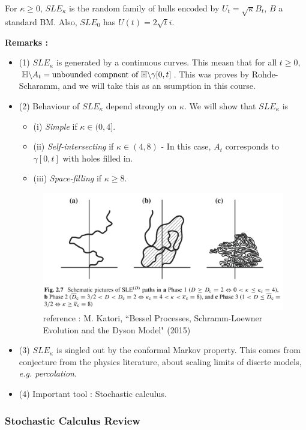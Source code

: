 \documentclass[12pt,a4paper]{article}
\renewenvironment{i}
{\begin{itemize} 
	}%
	{\end{itemize}
}
\begin{document}
For $\kappa\geq 0$, $SLE_{\kappa}$ is the random family of hulls encoded by $U_t = \sqrt{\kappa} B_t$, $B$ a standard BM. Also, $SLE_{0}$ has $U(t) = 2\sqrt{t} i$.
\s

\textbf{Remarks :}
\begin{i}
\item[(1)] $SLE_{\kappa}$ is generated by a continuous curves. This measn that for all $t\geq 0$, $\mathbb{H} \backslash A_t=\text{unbounded compnent of } \mathbb{H}\backslash \gamma[0,t]$. This was proves by Rohde-Scharamm, and we will take this as an ssumption in this course.
\item[(2)] Behaviour of $SLE_{\kappa}$ depend strongly on $\kappa$. We will show that $SLE_{\kappa}$ is
\begin{i}
\item[(i)] \emph{Simple} if $\kappa \in (0,4]$.
\item[(ii)] \emph{Self-intersecting} if $\kappa \in (4,8)$ - In this case, $A_t$ corresponds to $\gamma[0,t]$ with holes filled in.
\item[(iii)] \emph{Space-filling} if $\kappa \geq 8$.
\end{i}
\begin{figure}[h]
\begin{center}
    \includegraphics[scale =0.15]{6}
    \caption{reference : M. Katori, ``Bessel Processes, Schramm-Loewner Evolution and the Dyson Model" (2015)}
\end{center}
\end{figure}
\item[(3)] $SLE_{\kappa}$ is singled out by the conformal Markov property. This comes from conjecture from the physics literature, about scaling limits of discrte models, \textit{e.g. percolation}.
\item[(4)] Important tool : Stochastic calculus.
\end{i}
\s

\subsubsection*{Stochastic Calculus Review}
\end{document}
